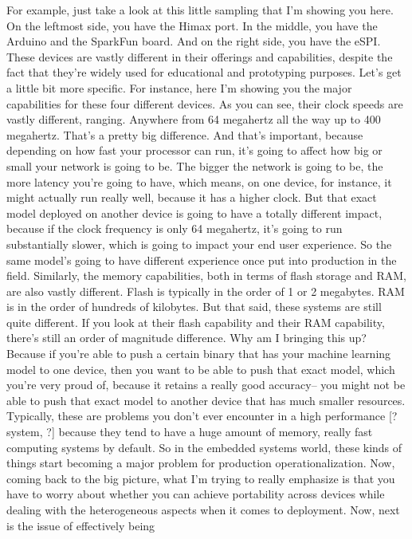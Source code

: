 For example, just take a look at this little sampling
that I'm showing you here.
On the leftmost side, you have the Himax port.
In the middle, you have the Arduino and the SparkFun board.
And on the right side, you have the eSPI.
These devices are vastly different in their offerings and capabilities,
despite the fact that they're widely used
for educational and prototyping purposes.
Let's get a little bit more specific.
For instance, here I'm showing you the major capabilities
for these four different devices.
As you can see, their clock speeds are vastly different, ranging.
Anywhere from 64 megahertz all the way up to 400 megahertz.
That's a pretty big difference.
And that's important, because depending on how fast your processor can run,
it's going to affect how big or small your network is going to be.
The bigger the network is going to be, the more latency you're going to have,
which means, on one device, for instance,
it might actually run really well, because it has a higher clock.
But that exact model deployed on another device
is going to have a totally different impact,
because if the clock frequency is only 64 megahertz,
it's going to run substantially slower, which is going
to impact your end user experience.
So the same model's going to have different experience once put
into production in the field.
Similarly, the memory capabilities, both in terms of flash storage and RAM,
are also vastly different.
Flash is typically in the order of 1 or 2 megabytes.
RAM is in the order of hundreds of kilobytes.
But that said, these systems are still quite different.
If you look at their flash capability and their RAM capability,
there's still an order of magnitude difference.
Why am I bringing this up?
Because if you're able to push a certain binary that has your machine
learning model to one device, then you want
to be able to push that exact model, which you're very proud of, because it
retains a really good accuracy-- you might not
be able to push that exact model to another device that
has much smaller resources.
Typically, these are problems you don't ever
encounter in a high performance [? system, ?]
because they tend to have a huge amount of memory, really fast computing
systems by default.
So in the embedded systems world, these kinds of things
start becoming a major problem for production operationalization.
Now, coming back to the big picture, what I'm trying to really emphasize
is that you have to worry about whether you can achieve portability
across devices while dealing with the heterogeneous aspects when
it comes to deployment.
Now, next is the issue of effectively being

